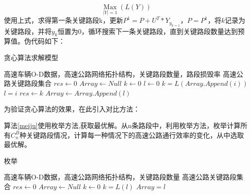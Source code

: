 				$$\mathop{Max}\limits_{|Y|=1} (L(Y))$$
			使用上式，求得第一条关键路段k，更新$P^1=P+U^T*Y_{y_{k=1}}$，$P=P^1$，将$k$记录为关键路段，并将$y_k$恒置为0，循环搜索下一条关键路段，直到关键路段数量达到预算值。伪代码如下：

		\begin{algorithm}[h]
        \caption{贪心算法求解模型}  
        \label{tanxin}
        \begin{algorithmic}[1] %
            \Require 高速车辆O-D数据，高速公路网络拓扑结构，关键路段数量，路段损毁率
            \Ensure 高速公路关键路段集合
                \State $res\gets 0$  
                \State $Array\gets Null$  
                \State $k\gets 0$  
                \State $l\gets 0$  
                        	\State $k=L(Array.Append(i))$  
                        	\State $l=i$  
                    	\EndIf
                	\EndFor    
                    \State $res\gets k$
                    \State $Array\gets Array.Append(l)$
                \EndWhile  
                \State {}  
            \EndFunction  
        \end{algorithmic}  
    	\end{algorithm} 

    	为验证贪心算法的效果，在此引入对比方法：

    	算法\ref{meiju}使用枚举方法,获取最优解。从n条路段中，利用枚举方法，枚举计算所有$C_n^B$种关键路段情况，计算每一种情况下的高速公路通行效率的变化，从中选取最优解。

    	\begin{algorithm}[!h]
        \caption{枚举} 
        \label{meiju} 
        \begin{algorithmic}[1] %
            \Require 高速车辆O-D数据，高速公路网络拓扑结构，关键路段数量
            \Ensure 高速公路关键路段集合
                \State $res\gets 0$  
                \State $Array\gets Null$  
                \State $k\gets 0$ 
                        	\State $k=L(l)$  
                        	\State $Array=l$  
                    	\EndIf
                	\EndFor  
                \State {}  
            \EndFunction  
        \end{algorithmic}  
    	\end{algorithm} 

